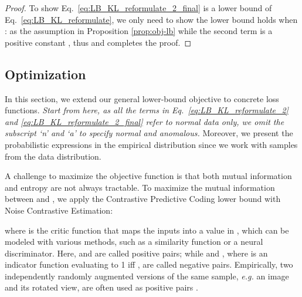 \documentclass[journal]{IEEEtran}
\theoremstyle{remark}
\begin{document}
\begin{proof}
To show Eq.~\eqref{eq:LB_KL_reformulate_2_final} is a lower bound of Eq.~\eqref{eq:LB_KL_reformulate}, we only need to show the lower bound holds when :
  as the assumption  in Proposition \ref{prop:obj-lb} while the second term is a positive constant , thus  and completes the proof.
\end{proof}


\subsection{Optimization}\label{sec:opt}In this section, we extend our general lower-bound objective to concrete loss functions. \emph{Start from here, as all the terms in Eq.~\ref{eq:LB_KL_reformulate_2} and \ref{eq:LB_KL_reformulate_2_final} refer to normal data only, we omit the subscript `n' and `a' to specify normal and anomalous.} Moreover, we present the probabilistic expressions in the empirical distribution since we work with samples from the data distribution. 

A challenge to maximize the objective function is that both mutual information and entropy are not always tractable. To maximize the mutual information between  and , we apply the Contrastive Predictive Coding lower bound with Noise Contrastive Estimation\cite{gutmann2010noise}:

where  is the critic function that maps the inputs into a value in , which can be modeled with various methods, such as a similarity function or a neural discriminator. Here,  and  are called positive pairs; while  and , where  is an indicator function evaluating to 1 iff , are called negative pairs. Empirically, two independently randomly augmented versions of the same sample, \textit{e.g.} an image and its rotated view, are often used as positive pairs \cite{SimCLR,AMDIM}. 
\end{document}
